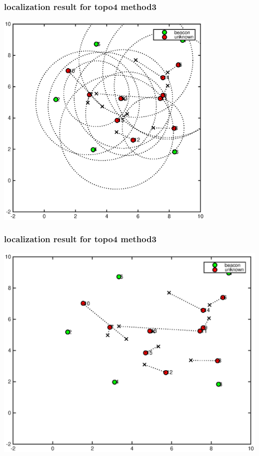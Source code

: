 \documentclass[11pt]{beamer}
\begin{document}
\begin{frame}
 \frametitle{localization result for topo4 method3}
\includegraphics[width=0.8\textwidth]{grass_final_mean_std_result_topo4_method3.eps} 
\end{frame}

\begin{frame}
 \frametitle{localization result for topo4 method3}
\includegraphics[width=\textwidth]{grass_final_mean_result_topo4_method3.eps} 
\end{frame}
\end{document}
